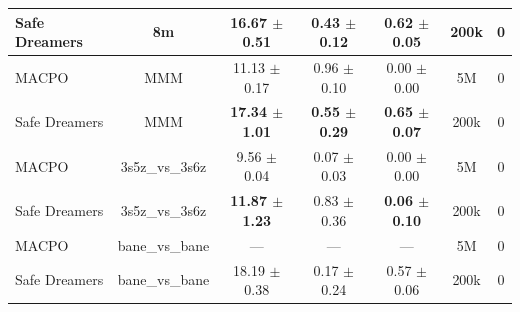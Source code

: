 \documentclass{article}
\begin{document}
\begin{longtable}{lcccccc}
Safe Dreamers & 8m & 16.67 $\pm$ 0.51 & 0.43 $\pm$ 0.12 & 0.62 $\pm$ 0.05 & 200k & 0 \\
\midrule
MACPO & MMM & 11.13 $\pm$ 0.17 & 0.96 $\pm$ 0.10 & 0.00 $\pm$ 0.00 & 5M & 0 \\
Safe Dreamers & MMM & \textbf{17.34 $\pm$ 1.01} & \textbf{0.55 $\pm$ 0.29} & \textbf{0.65 $\pm$ 0.07} & 200k & 0 \\
\midrule
MACPO & 3s5z\_vs\_3s6z & 9.56 $\pm$ 0.04 & 0.07 $\pm$ 0.03 & 0.00 $\pm$ 0.00 & 5M & 0 \\
Safe Dreamers & 3s5z\_vs\_3s6z & \textbf{11.87 $\pm$ 1.23} & 0.83 $\pm$ 0.36 & \textbf{0.06 $\pm$ 0.10} & 200k & 0 \\
\midrule
MACPO & bane\_vs\_bane & — & — & — & 5M & 0 \\
Safe Dreamers & bane\_vs\_bane & 18.19 $\pm$ 0.38 & 0.17 $\pm$ 0.24 & 0.57 $\pm$ 0.06 & 200k & 0 \\
\end{longtable}
\end{document}
